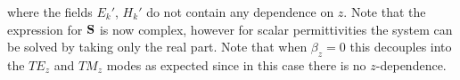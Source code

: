 where the fields $E_k'$, $H_k'$ do not contain any dependence on $z$. Note that
the expression for $\mathbf{S}$ is now complex, however for scalar permittivities the system can be solved by taking only
the real part\cite{zhao1997relationship,pile2005compact}.
%
Note that when $\beta_z = 0$ this decouples into the $TE_z$ and $TM_z$ modes as
expected since in this case there is no $z$-dependence.



%

